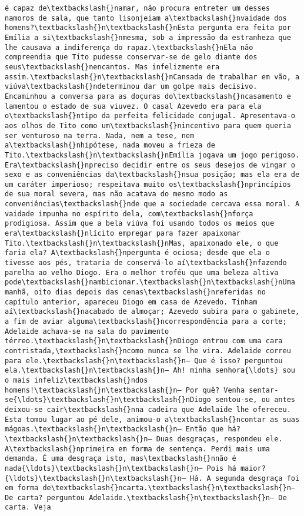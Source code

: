 \begin{Verbatim}[commandchars=\\\{\}]
é capaz de\textbackslash{}namar, não procura entreter um desses namoros de sala, que tanto lisonjeiam a\textbackslash{}nvaidade dos homens?\textbackslash{}n\textbackslash{}nEsta pergunta era feita por Emília a si\textbackslash{}nmesma, sob a impressão da estranheza que lhe causava a indiferença do rapaz.\textbackslash{}nEla não compreendia que Tito pudesse conservar-se de gelo diante dos seus\textbackslash{}nencantos. Mas infelizmente era assim.\textbackslash{}n\textbackslash{}nCansada de trabalhar em vão, a viúva\textbackslash{}ndeterminou dar um golpe mais decisivo. Encaminhou a conversa para as doçuras do\textbackslash{}ncasamento e lamentou o estado de sua viuvez. O casal Azevedo era para ela o\textbackslash{}ntipo da perfeita felicidade conjugal. Apresentava-o aos olhos de Tito como um\textbackslash{}nincentivo para quem queria ser venturoso na terra. Nada, nem a tese, nem a\textbackslash{}nhipótese, nada moveu a frieza de Tito.\textbackslash{}n\textbackslash{}nEmília jogava um jogo perigoso. Era\textbackslash{}npreciso decidir entre os seus desejos de vingar o sexo e as conveniências da\textbackslash{}nsua posição; mas ela era de um caráter imperioso; respeitava muito os\textbackslash{}nprincípios de sua moral severa, mas não acatava do mesmo modo as conveniências\textbackslash{}nde que a sociedade cercava essa moral. A vaidade impunha no espírito dela, com\textbackslash{}nforça prodigiosa. Assim que a bela viúva foi usando todos os meios que era\textbackslash{}nlícito empregar para fazer apaixonar Tito.\textbackslash{}n\textbackslash{}nMas, apaixonado ele, o que faria ela? A\textbackslash{}npergunta é ociosa; desde que ela o tivesse aos pés, trataria de conservá-lo aí\textbackslash{}nfazendo parelha ao velho Diogo. Era o melhor troféu que uma beleza altiva pode\textbackslash{}nambicionar.\textbackslash{}n\textbackslash{}nUma manhã, oito dias depois das cenas\textbackslash{}nreferidas no capítulo anterior, apareceu Diogo em casa de Azevedo. Tinham aí\textbackslash{}nacabado de almoçar; Azevedo subira para o gabinete, a fim de aviar alguma\textbackslash{}ncorrespondência para a corte; Adelaide achava-se na sala do pavimento térreo.\textbackslash{}n\textbackslash{}nDiogo entrou com uma cara contristada,\textbackslash{}ncomo nunca se lhe vira. Adelaide correu para ele.\textbackslash{}n\textbackslash{}n— Que é isso? perguntou ela.\textbackslash{}n\textbackslash{}n— Ah! minha senhora{\ldots} sou o mais infeliz\textbackslash{}ndos homens!\textbackslash{}n\textbackslash{}n— Por quê? Venha sentar-se{\ldots}\textbackslash{}n\textbackslash{}nDiogo sentou-se, ou antes deixou-se cair\textbackslash{}nna cadeira que Adelaide lhe ofereceu. Esta tomou lugar ao pé dele, animou-o a\textbackslash{}ncontar as suas mágoas.\textbackslash{}n\textbackslash{}n— Então que há?\textbackslash{}n\textbackslash{}n— Duas desgraças, respondeu ele. A\textbackslash{}nprimeira em forma de sentença. Perdi mais uma demanda. É uma desgraça isto, mas\textbackslash{}nnão é nada{\ldots}\textbackslash{}n\textbackslash{}n— Pois há maior?{\ldots}\textbackslash{}n\textbackslash{}n— Há. A segunda desgraça foi em forma de\textbackslash{}ncarta.\textbackslash{}n\textbackslash{}n— De carta? perguntou Adelaide.\textbackslash{}n\textbackslash{}n— De carta. Veja 
\end{Verbatim}
